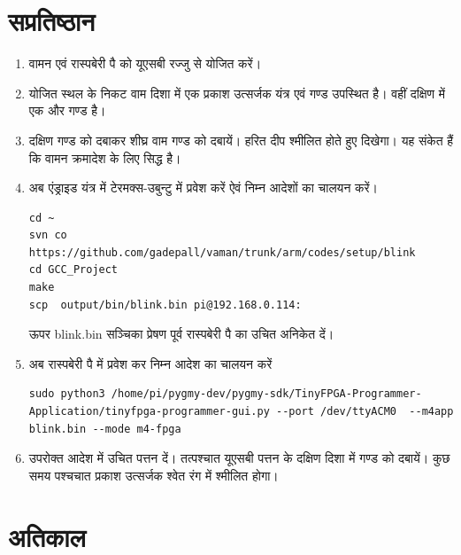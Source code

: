 \documentclass[journal,12pt,twocolumn]{IEEEtran}
\renewcommand\thesection{\arabic{section}}
\begin{document}
\section{सप्रतिष्ठान}
\renewcommand{\theequation}{\theenumi}
\renewcommand{\thefigure}{\theenumi}
\begin{enumerate}[label=\thesection.\arabic*.,ref=\thesection.\theenumi]

\item वामन एवं रास्पबेरी पै  को यूएसबी रज्जु से योजित करें।
\item योजित स्थल के निकट वाम दिशा में एक प्रकाश उत्सर्जक यंत्र एवं गण्ड  उपस्थित है।  वहीं दक्षिण में एक और गण्ड है।  
\item दक्षिण गण्ड को दबाकर शीघ्र वाम गण्ड को दबायें।  हरित दीप श्मीलित होते हुए दिखेगा।  यह संकेत हैं कि वामन
क्रमादेश के लिए सिद्ध है।

\item अब एंड्राइड यंत्र में टेरमक्स-उबुन्टु में प्रवेश करें ऐवं निम्न आदेशों का चालयन करें।
\begin{lstlisting}
cd ~
svn co https://github.com/gadepall/vaman/trunk/arm/codes/setup/blink
cd GCC_Project
make
scp  output/bin/blink.bin pi@192.168.0.114:
\end{lstlisting}
ऊपर blink.bin  सञ्चिका प्रेषण पूर्व रास्पबेरी पै का उचित अनिकेत दें। 
\item अब रास्पबेरी पै  में प्रवेश कर निम्न  आदेश का चालयन करें
\begin{lstlisting}
sudo python3 /home/pi/pygmy-dev/pygmy-sdk/TinyFPGA-Programmer-Application/tinyfpga-programmer-gui.py --port /dev/ttyACM0  --m4app  blink.bin --mode m4-fpga
\end{lstlisting}
\item उपरोक्त आदेश में उचित पत्तन दें। तत्पश्चात यूएसबी पत्तन के दक्षिण दिशा में गण्ड को दबायें। कुछ समय पश्चचात प्रकाश उत्सर्जक श्वेत रंग  में श्मीलित होगा। 
\end{enumerate}
%
\section{अतिकाल}
\end{document}
